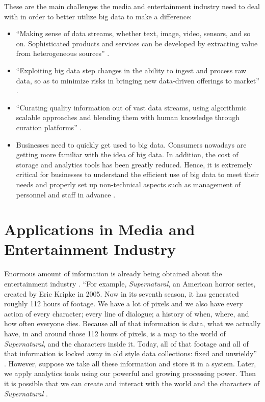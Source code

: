 \documentclass[sigconf]{acmart}
\begin{document}
These are the main challenges the media and entertainment industry need to deal with in order to better utilize big data to make a difference:
\begin{itemize}

  \item ``Making sense of data streams, whether text, image, video, sensors, and so on. Sophisticated products and services can be developed by extracting value from heterogeneous sources'' \cite{Lippell2016sectors}.
 
  \item ``Exploiting big data step changes in the ability to ingest and process raw data, so as to minimize risks in bringing new data-driven offerings to market'' \cite{Lippell2016sectors}.
 
  \item ``Curating quality information out of vast data streams, using algorithmic scalable approaches and blending them with human knowledge through curation platforms'' \cite{Lippell2016sectors}.
 
  \item Businesses need to quickly get used to big data. Consumers nowadays are getting more familiar with the idea of big data. In addition, the cost of storage and analytics tools has been greatly reduced. Hence, it is extremely critical for businesses to understand the efficient use of big data to meet their needs and properly set up non-technical aspects such as management of personnel and staff in advance \cite{Lippell2016sectors}.
 
\end{itemize}

\section{Applications in Media and Entertainment Industry}

Enormous amount of information is already being obtained about the entertainment industry \cite{Schlieski2012data}. ``For example, {\em Supernatural}, an American horror series, created by Eric Kripke in 2005. Now in its seventh season, it has generated roughly 112 hours of footage. We have a lot of pixels and we also have every action of every character; every line of dialogue; a history of when, where, and how often everyone dies. Because all of that information is data, what we actually have, in and around those 112 hours of pixels, is a map to the world of {\em Supernatural}, and the characters inside it. Today, all of that footage and all of that information is locked away in old style data collections: fixed and unwieldy'' \cite{Schlieski2012data}. However, suppose we take all these information and store it in a system. Later, we apply analytics tools using our powerful and growing processing power. Then it is possible that we can create and interact with the world and the characters of {\em Supernatural} \cite{Schlieski2012data}.
\end{document}
